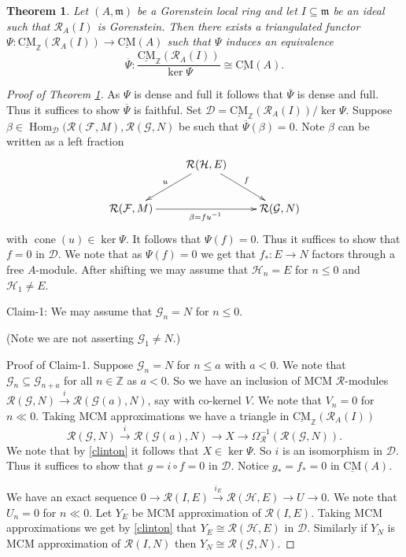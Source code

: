 \documentclass[10pt,a4paper]{amsart}
\newtheorem{theorem}{Theorem}
\newcommand{\CMS}{\operatorname{\underline{CM}}}
\newcommand{\D}{\mathcal{D} }
\newcommand{\Dc}{\mathcal{D}}
\newcommand{\Fc}{\mathcal{F} }
\newcommand{\Gc}{\mathcal{G} }
\newcommand{\Hc}{\mathcal{H} }
\newcommand{\Hom}{\operatorname{Hom}}
\newcommand{\Z}{\mathbb{Z} }
\newcommand{\cone}{\operatorname{cone}}
\newcommand{\eR}{\mathcal{R} }
\newcommand{\m}{\mathfrak{m} }
\newcommand{\ov}{\overline}
\newcommand{\rt}{\rightarrow}
\begin{document}
\begin{theorem}
\label{fourth} Let $(A,\m)$ be a Gorenstein local ring and let $I \subseteq \m$ be an ideal such that $\eR_A(I)$ is Gorenstein. Then  there exists a triangulated functor \\ $\Psi \colon \CMS_\Z(\eR_A(I)) \rt \CMS(A)$ such that $\Psi$ induces an equivalence
$$\ov{\Psi} \colon \frac{\CMS_\Z(\eR_A(I))}{\ker \Psi} \cong \CMS(A).$$
\end{theorem}

\begin{proof}[Proof of Theorem \ref{fourth}]
As $\Psi$ is dense and full it follows that $\ov{\Psi}$ is dense and full. Thus it suffices to show $\ov{\Psi}$ is faithful. Set $\Dc =  \CMS_\Z(\eR_A(I))/\ker \Psi$. Suppose
$\beta \in \Hom_{\Dc}(\eR(\Fc, M), \eR(\Gc, N)$ be such that $\ov{\Psi}(\beta) = 0$.
Note  $\beta $ can be written as a left fraction
\[
\xymatrix{
\
&\eR(\Hc, E)
\ar@{->}[dl]_{u}
\ar@{->}[dr]^{f}
 \\
\eR(\Fc, M)
\ar@{->}[rr]_{\beta = fu^{-1}}
&\
&\eR(\Gc, N)
}
\]
with $\cone(u) \in \ker \Psi$. It follows that $\Psi(f) = 0$. Thus it suffices to show that
$f = 0$ in $\D$. We note that as $\Psi(f) = 0$ we get that $f_* \colon E \rt N$ factors through a free $A$-module.
After shifting we may assume that $\Hc_n = E$ for $n \leq 0$ and $\Hc_1 \neq E$.

Claim-1: We may assume that $\Gc_n = N$ for $n \leq 0$.

(Note we are not asserting $\Gc_1 \neq N$.)

Proof of Claim-1. Suppose $\Gc_n = N$ for $n \leq a$ with $a < 0$.
We note that $\Gc_n \subseteq \Gc_{n+a}$ for all $n \in \Z$ as $a < 0$. So we have an inclusion of MCM $\eR$-modules
$ \eR(\Gc, N) \xrightarrow{i} \eR(\Gc(a), N)$, say  with co-kernel $V$. We note that $V_n =0$ for $n \ll 0$. Taking  MCM approximations we have a triangle in  $\CMS_\Z(\eR_A(I))$
$$ \eR(\Gc, N) \xrightarrow{i}  \eR(\Gc(a), N) \rt X \rt \Omega^{-1}_{\eR}(\eR(\Gc, N)).$$
We note that by \ref{clinton} it follows that $X \in \ker \Psi$. So $i$ is an isomorphism in $\D$.
Thus it suffices to show that $g = i\circ f = 0$ in $\D$. Notice $g_* = f_* =0$ in $\CMS(A)$.


We have an exact sequence $0  \rt \eR(I, E) \xrightarrow{i_E} \eR(\Hc, E) \rt U \rt 0$. We note that $U_n = 0$ for $n \ll 0$.  Let $Y_E$ be MCM approximation of $\eR(I, E)$. Taking MCM approximations we get by \ref{clinton} that $Y_E \cong \eR(\Hc, E)$ in $\D$. Similarly if $Y_N$ is MCM approximation of $\eR(I, N)$ then $Y_N \cong \eR(\Gc, N)$.


\end{proof}
\end{document}
